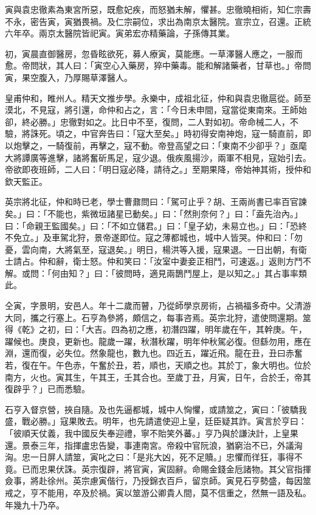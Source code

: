 \begin{pinyinscope}
寅與袁忠徹素為東宮所惡，既愈妃疾，而怒猶未解，懼甚。忠徹曉相術，知仁宗壽不永，密告寅，寅猶畏禍。及仁宗嗣位，求出為南京太醫院。宣宗立，召還。正統六年卒。兩京太醫院皆祀寅。寅弟宏亦精藥論，子孫傳其業。

初，寅晨直御醫房，忽昏眩欲死，募人療寅，莫能應。一草澤醫人應之，一服而愈。帝問狀，其人曰：「寅空心入藥房，猝中藥毒。能和解諸藥者，甘草也。」帝問寅，果空腹入，乃厚賜草澤醫人。

皇甫仲和，睢州人。精天文推步學。永樂中，成祖北征，仲和與袁忠徹扈從。師至漠北，不見寇，將引還，命仲和占之，言：「今日未申間，寇當從東南來。王師始卻，終必勝。」忠徹對如之。比日中不至，復問，二人對如初。帝命械二人，不驗，將誅死。頃之，中官奔告曰：「寇大至矣。」時初得安南神炮，寇一騎直前，即以炮擊之，一騎復前，再擊之，寇不動。帝登高望之曰：「東南不少卻乎？」亟麾大將譚廣等進擊，諸將奮斫馬足，寇少退。俄疾風揚沙，兩軍不相見，寇始引去。帝欲即夜班師，二人曰：「明日寇必降，請待之。」至期果降，帝始神其術，授仲和欽天監正。

英宗將北征，仲和時已老，學士曹鼐問曰：「駕可止乎？胡、王兩尚書已率百官諫矣。」曰：「不能也，紫微垣諸星已動矣。」曰：「然則奈何？」曰：「盍先治內。」曰：「命親王監國矣。」曰：「不如立儲君。」曰：「皇子幼，未易立也。」曰：「恐終不免立。」及車駕北狩，景帝遂即位。寇之薄都城也，城中人皆哭。仲和曰：「勿憂，雲向南，大將氣至，寇退矣。」明日，楊洪等入援，寇果退。一日出朝，有衛士請占。仲和辭，衛士怒。仲和笑曰：「汝室中妻妾正相鬥，可速返。」返則方鬥不解。或問：「何由知？」曰：「彼問時，適見兩鵲鬥屋上，是以知之。」其占事率類此。

仝寅，字景明，安邑人。年十二歲而瞽，乃從師學京房術，占禍福多奇中。父清游大同，攜之行塞上。石亨為參將，頗信之，每事咨焉。英宗北狩，遣使問還期。筮得《乾》之初，曰：「大吉。四為初之應，初潛四躍，明年歲在午，其幹庚。午，躍候也。庚良，更新也。龍歲一躍，秋潛秋躍，明年仲秋駕必復。但繇勿用，應在淵，還而復，必失位。然象龍也，數九也。四近五，躍近飛。龍在丑，丑曰赤奮若，復在午。午色赤，午奮於丑，若，順也，天順之也。其於丁，象大明也。位於南方，火也。寅其生，午其王，壬其合也。至歲丁丑，月寅，日午，合於壬，帝其復辟乎？」已而悉驗。

石亨入督京營，挾自隨。及也先逼都城，城中人恟懼，或請筮之，寅曰：「彼驕我盛，戰必勝。」寇果敗去。明年，也先請遣使迎上皇，廷臣疑其詐。寅言於亨曰：「彼順天仗義，我中國反失奉迎禮，寧不貽笑外蕃。」亨乃與於謙決計，上皇果還。景泰三年，指揮盧忠告變，事連南宮。帝殺中官阮浪，猶窮治不已，外議洶洶。忠一日屏人請筮，寅叱之曰：「是兆大凶，死不足贖。」忠懼而徉狂，事得不竟。已而忠果伏誅。英宗復辟，將官寅，寅固辭。命賜金錢金卮諸物。其父官指揮僉事，將赴徐州。英宗慮寅偕行，乃授錦衣百戶，留京師。寅見石亨勢盛，每因筮戒之，亨不能用，卒及於禍。寅以筮游公卿貴人間，莫不信重之，然無一語及私。年幾九十乃卒。


\end{pinyinscope}
